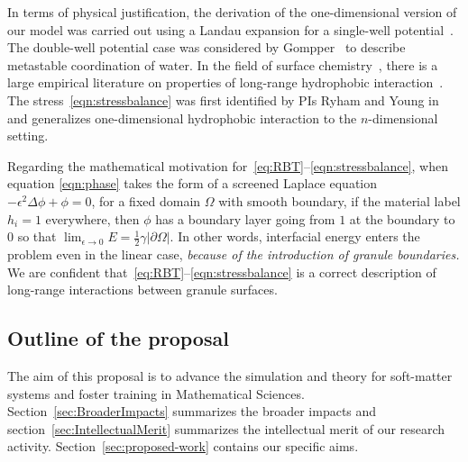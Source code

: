 In terms of physical justification, the derivation of the
one-dimensional version of our model was carried out using a Landau
expansion for a single-well potential~\cite{MaRa76, ErLjCl89}.
The double-well potential case was
considered by Gompper~\cite{GoHaKo94} to describe metastable
coordination of water. In the field of surface
chemistry~\cite{Israelachvili1954}, there is a large empirical
literature on properties of long-range hydrophobic
interaction~\cite{LeRaPa77, KoNa15, Nagle17, Lum1999, Lin2005,
Meyer2006, Ducker2016, Jackson2016, Gletal88, Aketal17, Ch05}. The
stress~\eqref{eqn:stressbalance} was first identified by PIs Ryham and
Young in~\cite{Fu2018_SIAM} and generalizes one-dimensional hydrophobic
interaction to the $n$-dimensional setting. 

Regarding the mathematical motivation for~\eqref{eq:RBT}--\eqref{eqn:stressbalance},
when equation \eqref{eqn:phase} takes the form of a screened Laplace equation
$-\epsilon^2 \Delta \phi + \phi =0$, for a fixed domain $\Omega$ with
smooth boundary, if the material label $h_i = 1$
everywhere, then $\phi$ has a boundary layer going from $1$ at the
boundary to $0$ so that 
$\lim_{\epsilon \to 0} E = \frac{1}{2}\gamma |\partial \Omega|$.
In other words, 
interfacial energy enters the problem even in the linear case,
\emph{because of the introduction of granule boundaries.}
We are confident
that~\eqref{eq:RBT}--\eqref{eqn:stressbalance} is a correct description
of long-range interactions between granule surfaces.


\subsection{Outline of the proposal}
The aim of this proposal is to advance the simulation and theory for
soft-matter systems and foster training in Mathematical Sciences.
Section~\ref{sec:BroaderImpacts} summarizes the broader impacts and
section~\ref{sec:IntellectualMerit} summarizes the intellectual merit of
our research activity. Section~\ref{sec:proposed-work} contains our
specific aims.





